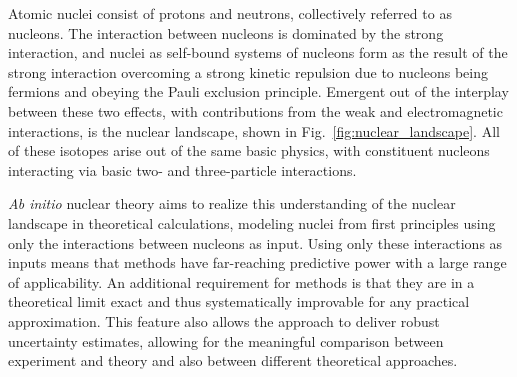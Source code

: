 Atomic nuclei consist of protons and neutrons, collectively referred to as nucleons.
The interaction between nucleons is dominated by the strong interaction,
and nuclei as self-bound systems of nucleons form as the result of the strong interaction
overcoming a strong kinetic repulsion
due to nucleons being fermions and obeying the Pauli exclusion principle.
Emergent out of the interplay between these two effects,
with contributions from the weak and electromagnetic interactions,
is the nuclear landscape,
shown in Fig.~\ref{fig:nuclear_landscape}.
All of these isotopes arise out of the same basic physics,
with constituent nucleons interacting via basic two- and three-particle interactions.

\textit{Ab initio} nuclear theory aims to realize this understanding of the nuclear landscape
in theoretical calculations,
modeling nuclei from first principles using only the interactions between nucleons as input.
Using only these interactions as inputs means that \abinitio{} methods
have far-reaching predictive power with a large range of applicability.
An additional requirement for \abinitio{} methods is that they are in a theoretical limit exact
and thus systematically improvable for any practical approximation.
This feature also allows the \abinitio{} approach to deliver robust uncertainty estimates,
allowing for the meaningful comparison between experiment and theory
and also between different \abinitio{} theoretical approaches.

